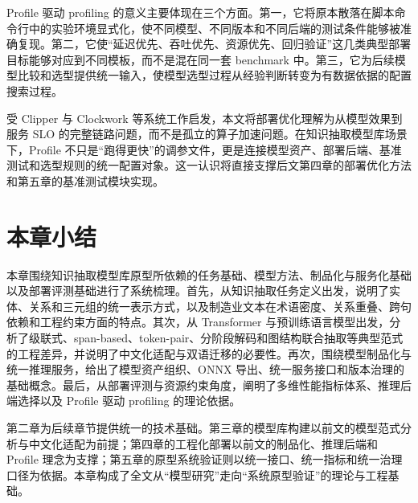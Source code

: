 Profile 驱动 profiling 的意义主要体现在三个方面。第一，它将原本散落在脚本命令行中的实验环境显式化，使不同模型、不同版本和不同后端的测试条件能够被准确复现。第二，它使“延迟优先、吞吐优先、资源优先、回归验证”这几类典型部署目标能够对应到不同模板，而不是混在同一套 benchmark 中。第三，它为后续模型比较和选型提供统一输入，使模型选型过程从经验判断转变为有数据依据的配置搜索过程。

受 Clipper 与 Clockwork 等系统工作启发\cite{clipper2017,clockwork2020}，本文将部署优化理解为从模型效果到服务 SLO 的完整链路问题，而不是孤立的算子加速问题。在知识抽取模型库场景下，Profile 不只是“跑得更快”的调参文件，更是连接模型资产、部署后端、基准测试和选型规则的统一配置对象。这一认识将直接支撑后文第四章的部署优化方法和第五章的基准测试模块实现。

\section{本章小结}
本章围绕知识抽取模型库原型所依赖的任务基础、模型方法、制品化与服务化基础以及部署评测基础进行了系统梳理。首先，从知识抽取任务定义出发，说明了实体、关系和三元组的统一表示方式，以及制造业文本在术语密度、关系重叠、跨句依赖和工程约束方面的特点。其次，从 Transformer 与预训练语言模型出发，分析了级联式、span-based、token-pair、分阶段解码和图结构联合抽取等典型范式的工程差异，并说明了中文化适配与双语迁移的必要性。再次，围绕模型制品化与统一推理服务，给出了模型资产组织、ONNX 导出、统一服务接口和版本治理的基础概念。最后，从部署评测与资源约束角度，阐明了多维性能指标体系、推理后端选择以及 Profile 驱动 profiling 的理论依据。

第二章为后续章节提供统一的技术基础。第三章的模型库构建以前文的模型范式分析与中文化适配为前提；第四章的工程化部署以前文的制品化、推理后端和 Profile 理念为支撑；第五章的原型系统验证则以统一接口、统一指标和统一治理口径为依据。本章构成了全文从“模型研究”走向“系统原型验证”的理论与工程基础。
